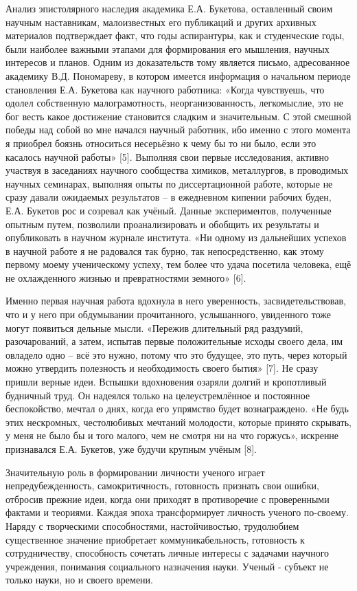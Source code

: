 Анализ эпистолярного наследия академика Е.А. Букетова, оставленный своим
научным наставникам, малоизвестных его публикаций и других архивных
материалов подтверждает факт, что годы аспирантуры, как и студенческие
годы, были наиболее важными этапами для формирования его мышления,
научных интересов и планов. Одним из доказательств тому является письмо,
адресованное академику В.Д. Пономареву, в котором имеется информация о
начальном периоде становления Е.А. Букетова как научного работника:
«Когда чувствуешь, что одолел собственную малограмотность,
неорганизованность, легкомыслие, это не бог весть какое достижение
становится сладким и значительным. С этой смешной победы над собой во
мне начался научный работник, ибо именно с этого момента я приобрел
боязнь относиться несерьёзно к чему бы то ни было, если это касалось
научной работы» {[}5{]}. Выполняя свои первые исследования, активно
участвуя в заседаниях научного сообщества химиков, металлургов, в
проводимых научных семинарах, выполняя опыты по диссертационной работе,
которые не сразу давали ожидаемых результатов -- в ежедневном кипении
рабочих буден, Е.А. Букетов рос и созревал как учёный. Данные
экспериментов, полученные опытным путем, позволили проанализировать и
обобщить их результаты и опубликовать в научном журнале института. «Ни
одному из дальнейших успехов в научной работе я не радовался так бурно,
так непосредственно, как этому первому моему ученическому успеху, тем
более что удача посетила человека, ещё не охлажденного жизнью и
превратностями земного» {[}6{]}.

Именно первая научная работа вдохнула в него уверенность,
засвидетельствовав, что и у него при обдумывании прочитанного,
услышанного, увиденного тоже могут появиться дельные мысли. «Пережив
длительный ряд раздумий, разочарований, а затем, испытав первые
положительные исходы своего дела, им овладело одно -- всё это нужно,
потому что это будущее, это путь, через который можно утвердить
полезность и необходимость своего бытия» {[}7{]}. Не сразу пришли верные
идеи. Вспышки вдохновения озаряли долгий и кропотливый будничный труд.
Он надеялся только на целеустремлённое и постоянное беспокойство, мечтал
о днях, когда его упрямство будет вознаграждено. «Не будь этих
нескромных, честолюбивых мечтаний молодости, которые принято скрывать, у
меня не было бы и того малого, чем не смотря ни на что горжусь»,
искренне признавался Е.А. Букетов, уже будучи крупным учёным {[}8{]}.

Значительную роль в формировании личности ученого играет
непредубежденность, самокритичность, готовность признать свои ошибки,
отбросив прежние идеи, когда они приходят в противоречие с проверенными
фактами и теориями. Каждая эпоха трансформирует личность ученого
по-своему. Наряду с творческими способностями, настойчивостью,
трудолюбием существенное значение приобретает коммуникабельность,
готовность к сотрудничеству, способность сочетать личные интересы с
задачами научного учреждения, понимания социального назначения науки.
Ученый - субъект не только науки, но и своего времени.

